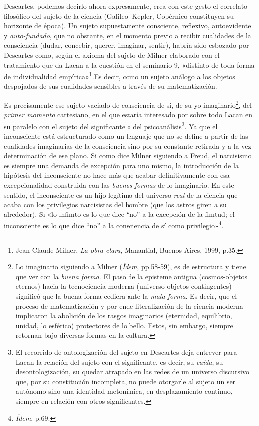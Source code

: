 Descartes, podemos decirlo ahora expresamente, crea con este gesto el correlato filosófico del sujeto de la ciencia (Galileo, Kepler, Copérnico constituyen su horizonte de época). Un sujeto supuestamente consciente, reflexivo, autoevidente y \emph{auto-fundado}, que no obstante, en el momento previo a recibir cualidades de la consciencia (dudar, concebir, querer, imaginar, sentir), habría sido esbozado por Descartes como, según el axioma del sujeto de Milner elaborado con el tratamiento que da Lacan a la cuestión en el seminario 9, «distinto de toda forma de individualidad empírica»\footnote{Jean-Claude Milner, \emph{La obra clara}, Manantial, Buenos Aires, 1999, p.35.}.Es decir, como un sujeto análogo a los objetos despojados de sus cualidades sensibles a través de su matematización.

Es precisamente ese sujeto vaciado de consciencia de sí, de su yo imaginario\footnote{Lo imaginario siguiendo a Milner (\emph{Ídem}, pp.58-59), es de estructura y tiene que ver con la \emph{buena forma}. El paso de la episteme antigua (cosmos-objetos eternos) hacia la tecnociencia moderna (universo-objetos contingentes) significó que la buena forma cediera ante la \emph{mala forma}. Es decir, que el proceso de matematización y por ende literalización de la ciencia moderna implicaron la abolición de los rasgos imaginarios (eternidad, equilibrio, unidad, lo esférico) protectores de lo bello. Estos, sin embargo, siempre retornan bajo diversas formas en la cultura.}, del \emph{primer momento} cartesiano, en el que estaría interesado por sobre todo Lacan en su paralelo con el sujeto del significante o del psicoanálisis\footnote{El recorrido de ontologización del sujeto en Descartes deja entrever para Lacan la relación del sujeto con el significante, es decir, su \emph{caída}, su desontologización, su quedar atrapado en las redes de un universo discursivo que, por su constitución incompleta, no puede otorgarle al sujeto un ser autónomo sino una identidad metonímica, en desplazamiento continuo, siempre en relación con otros significantes.}. Ya que el inconsciente está estructurado como un lenguaje que no se define a partir de las cualidades imaginarias de la consciencia sino por su constante retirada y a la vez determinación de ese plano. Si como dice Milner siguiendo a Freud, el narcisismo es siempre una demanda de excepción para uno mismo, la introducción de la hipótesis del inconsciente no hace más que acabar definitivamente con esa excepcionalidad construida con las \emph{buenas formas} de lo imaginario. En este sentido, el inconsciente es un hijo legítimo del universo \emph{real} de la ciencia que acaba con los privilegios narcisistas del hombre (que los astros giren a su alrededor). Si «lo infinito es lo que dice ``no'' a la excepción de la finitud; el inconsciente es lo que dice ``no'' a la consciencia de sí como privilegio»\footnote{\emph{Ídem}, p.69.}.

